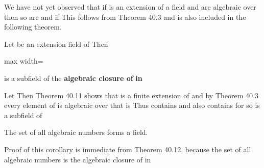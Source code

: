 \documentclass[11pt,oneside]{article}
\begin{document}
\BookNarrativetrue

\begin{BookBody}


\noindent We have not yet observed that if  is an extension of a field  and  are algebraic over  then so are \BookInline{\alpha + \beta,\allowbreak \alpha \beta,\allowbreak \alpha - \beta,\allowbreak } and \BookInline{\alpha /\beta,\allowbreak } if  This follows from Theorem 40.3 and is also included in the following theorem.

 Let  be an extension field of  Then

\begin{center}\begin{adjustbox}{max width=\linewidth}\end{adjustbox}\end{center}

\noindent is a subfield of  the\textbf{ algebraic closure of}  \textbf{in} 

 Let  Then Theorem 40.11 shows that  is a finite extension of  and by Theorem 40.3 every element of  is algebraic over  that is Thus  contains \BookInline{\alpha + \beta,\allowbreak \alpha \beta,\allowbreak \alpha - \beta,\allowbreak } and also contains \BookInline{\alpha /\beta } for  so  is a subfield of  \BookEnd{\blacklozenge}

 The set of all algebraic numbers forms a field.

 Proof of this corollary is immediate from Theorem 40.12, because the set of all algebraic numbers is the algebraic closure of  in \BookEnd{\blacklozenge}


\end{BookBody}
\end{document}
